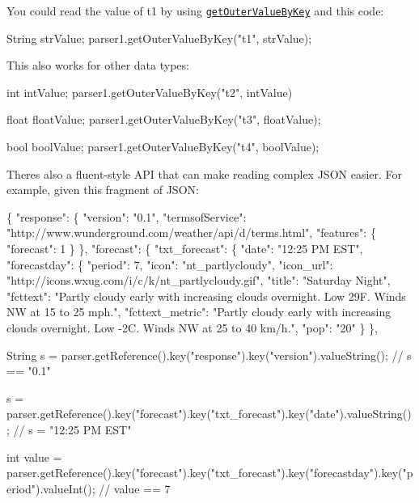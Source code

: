 You could read the value of t1 by using \href{http://rickkas7.github.io/JsonParserGeneratorRK/class_json_parser.html#a38858994342cd2735b716b117bf8afdf}{\tt get\+Outer\+Value\+By\+Key} and this code\+:


\begin{DoxyCode}
String strValue;
parser1.getOuterValueByKey("t1", strValue);
\end{DoxyCode}


This also works for other data types\+:


\begin{DoxyCode}
int intValue;
parser1.getOuterValueByKey("t2", intValue)

float floatValue;
parser1.getOuterValueByKey("t3", floatValue);

bool boolValue;
parser1.getOuterValueByKey("t4", boolValue);
\end{DoxyCode}


There\textquotesingle{}s also a fluent-\/style A\+PI that can make reading complex J\+S\+ON easier. For example, given this fragment of J\+S\+ON\+:


\begin{DoxyCode}
\{
    "response": \{
        "version": "0.1",
        "termsofService": "http://www.wunderground.com/weather/api/d/terms.html",
        "features": \{
            "forecast": 1
        \}
    \},
    "forecast": \{
        "txt\_forecast": \{
            "date": "12:25 PM EST",
            "forecastday": \{
                "period": 7,
                "icon": "nt\_partlycloudy",
                "icon\_url": "http://icons.wxug.com/i/c/k/nt\_partlycloudy.gif",
                "title": "Saturday Night",
                "fcttext": "Partly cloudy early with increasing clouds overnight. Low 29F. Winds NW at 15
       to 25 mph.",
                "fcttext\_metric": "Partly cloudy early with increasing clouds overnight. Low -2C. Winds NW
       at 25 to 40 km/h.",
                "pop": "20"
            \}
        \},
\end{DoxyCode}



\begin{DoxyCode}
String s = parser.getReference().key("response").key("version").valueString();
// s == "0.1"

s = parser.getReference().key("forecast").key("txt\_forecast").key("date").valueString();
// s = "12:25 PM EST"

int value =
       parser.getReference().key("forecast").key("txt\_forecast").key("forecastday").key("period").valueInt();
// value == 7
\end{DoxyCode}


